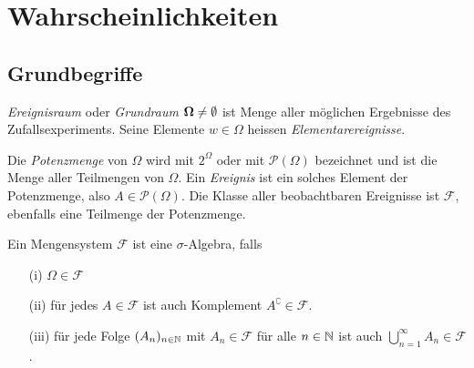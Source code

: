 \setcounter{section}{0} %

\section{Wahrscheinlichkeiten}

\subsection{Grundbegriffe}
\begin{definition}
\textit{Ereignisraum} oder \textit{Grundraum} $\boldsymbol{\Omega} \neq \emptyset$ ist Menge aller möglichen Ergebnisse des Zufallsexperiments. Seine Elemente $w\in \Omega$ heissen \textit{Elementarereignisse}.
\end{definition} 

\begin{definition}
Die \textit{Potenzmenge} von $\Omega$ wird mit $2^\Omega$ oder mit $\mathcal{P}(\Omega)$ bezeichnet und ist die Menge aller Teilmengen von $\Omega$. Ein \textit{Ereignis} ist ein solches Element der Potenzmenge, also $A\in\mathcal{P}(\Omega)$. Die Klasse aller beobachtbaren Ereignisse ist $\mathcal{F}$, ebenfalls eine Teilmenge der Potenzmenge.
\end{definition}

\begin{definition}
Ein Mengensystem $\mathcal{F}$ ist eine $\sigma$-Algebra, falls
\begin{itemize}
\item[(i)] $\Omega \in \mathcal{F}$
\item[(ii)] für jedes $A\in\mathcal{F}$ ist auch Komplement $A^\complement \in \mathcal{F}$. 
\item[(iii)] für jede Folge $(A_n)_{n\in\mathbb{N}}$ mit $A_n \in \mathcal{F}$ für alle $n\in \mathbb{N}$ ist auch $\bigcup_{n=1}^\infty A_n \in \mathcal{F}$.
\end{itemize}
\end{definition}

